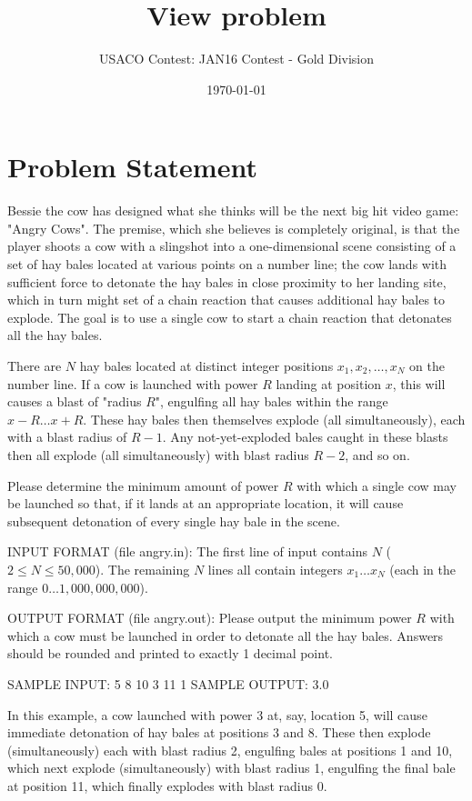 \documentclass[12pt]{article}
\title{View problem}
\author{USACO Contest: JAN16 Contest - Gold Division}
\date{\today}
\begin{document}
\maketitle

\section*{Problem Statement}

Bessie the cow has designed what she thinks will be the next big hit video game:
"Angry Cows".  The premise,  which she believes is completely original, is that
the player shoots a cow with a slingshot  into a one-dimensional scene
consisting of a set of hay bales located at various points on a number line; the
cow lands with sufficient force to detonate the hay bales in close proximity to
her landing site, which in turn might set of a chain reaction that causes 
additional hay bales to explode.  The goal is to use a single cow to start a
chain reaction that detonates all the hay bales.

There are $N$ hay bales located at distinct integer positions
$x_1, x_2, \ldots, x_N$ on the number line.  If a cow is launched with power $R$
landing at position $x$, this will causes a blast of "radius $R$", engulfing all
hay bales within the range $x-R \ldots x+R$.  These hay bales then themselves
explode (all simultaneously), each with a blast radius of $R-1$.  Any
not-yet-exploded bales caught in these blasts then all explode (all
simultaneously) with blast radius $R-2$, and so on.

Please determine the minimum amount of power $R$ with which a single cow may be
launched so that, if it lands at an appropriate location, it will cause
subsequent detonation of every single hay bale in the scene.

INPUT FORMAT (file angry.in):
The first line of input contains $N$ ($2 \leq N \leq 50,000$).  The remaining
$N$ lines all  contain integers $x_1 \ldots x_N$ (each in the range
$0 \ldots 1,000,000,000$).

OUTPUT FORMAT (file angry.out):
Please output the minimum power $R$ with which a cow must be launched in order
to detonate all the hay bales.  Answers should be rounded and printed to exactly
1 decimal point.

SAMPLE INPUT:
5
8
10
3
11
1
SAMPLE OUTPUT: 
3.0

In this example, a cow launched with power 3 at, say, location 5, will cause
immediate detonation of  hay bales at positions 3 and 8.  These then explode
(simultaneously) each with blast radius 2, engulfing bales at positions 1 and
10, which next explode (simultaneously) with blast radius 1, engulfing the final
bale at position 11, which finally explodes with blast radius 0.
\end{document}
